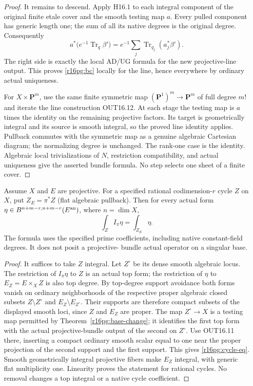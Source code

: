 \begin{proof}
It remains to descend. Apply H16.1 to each integral component of
the original finite etale cover and the smooth testing map $a$.
Every pulled component has generic length one; the sum of all
its native degrees is the original degree. Consequently
\[
 a^*\bigl(e^{-1}\operatorname{Tr}_q\beta'\bigr)
   =e^{-1}\sum_j\operatorname{Tr}_{q_j}(a_j^*\beta').
 \tag{PG16.3}\label{r16pg:descent}
\]
The right side is exactly the local AD/UG formula for the new
projective-line output. This proves \eqref{r16pg:bc} locally for
the line, hence everywhere by ordinary actual uniqueness.

For $X\times\mathbf P^m$, use the same finite symmetric map
$(\mathbf P^1)^m\to\mathbf P^m$ of full degree $m!$ and iterate
the line construction OUT16.12. At each stage the testing map
is $a$ times the identity on the remaining projective factors.
Its target is geometrically integral and its source is smooth
integral, so the proved line identity applies. Pullback commutes
with the symmetric map as a genuine algebraic Cartesian diagram;
the normalizing degree is unchanged. The rank-one case is the
identity. Algebraic local trivializations of $N$, restriction
compatibility, and actual uniqueness give the asserted bundle
formula. No step selects one sheet of a finite cover.
\end{proof}

\begin{lemma}
\label{r16pg:cycle}
Assume $X$ and $E$ are projective. For a specified rational
codimension-$r$ cycle $Z$ on $X$, put $Z_E=\pi^*Z$ (flat
algebraic pullback). Then for every actual form
$\eta\in B^{n+m-r,n+m-r}(E^{\rm an})$, where $n=\dim X$,
\[
                  \int_Z I_\pi\eta=\int_{Z_E}\eta.
 \tag{PG16.4}\label{r16pg:cycle-eq}
\]
The formula uses the specified prime coefficients, including
native constant-field degrees. It does not posit a projective-
bundle actual operator on a singular base.
\end{lemma}

\begin{proof}
It suffices to take $Z$ integral. Let $Z^\circ$ be its dense
smooth algebraic locus. The restriction of $I_\pi\eta$ to $Z$
is an actual top form; the restriction of $\eta$ to
$E_Z=E\times_X Z$ is also top degree. By top-degree support
avoidance both forms vanish on ordinary neighborhoods of the
respective proper algebraic closed subsets $Z\setminus Z^\circ$
and $E_Z\setminus E_{Z^\circ}$. Their supports are therefore
compact subsets of the displayed smooth loci, since $Z$ and
$E_Z$ are proper. The map $Z^\circ\to X$ is a testing map
permitted by Theorem~\ref{r16pg:base-change}; it identifies the
first top form with the actual projective-bundle output of the
second on $Z^\circ$. Use OUT16.11 there, inserting a compact
ordinary smooth scalar equal to one near the proper projection
of the second support and the first support. This gives
\eqref{r16pg:cycle-eq}. Smooth geometrically integral projective
fibers make $E_Z$ integral, with generic flat multiplicity one.
Linearity proves the statement for rational cycles. No removal
changes a top integral or a native cycle coefficient.
\end{proof}

